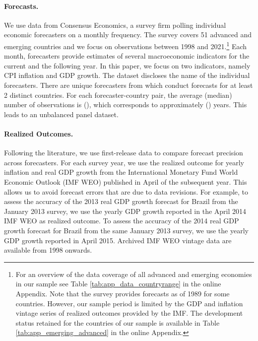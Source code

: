 
\paragraph{Forecasts.} We use data from Consensus Economics, a survey firm polling individual economic forecasters on a monthly frequency. The survey covers 51 advanced and emerging countries and we focus on observations between 1998 and 2021.\footnote{For an overview of the data coverage of all advanced and emerging economies in our sample see Table \ref{tab:app_data_countryrange} in the online Appendix. Note that the survey provides forecasts as of 1989 for some countries. However, our sample period is limited by the GDP and inflation vintage series of realized outcomes provided by the IMF. The development status retained for the countries of our sample is available in Table \ref{tab:app_emerging_advanced} in the online Appendix.} Each month, forecasters provide estimates of several macroeconomic indicators for the current and the following year. %
 In this paper, we focus on two indicators, namely CPI inflation and GDP growth. The dataset discloses the name of the individual forecasters. There are  unique forecasters from which  conduct forecasts for at least 2 distinct countries.  For each forecaster-country pair, the average (median) number of observations is  (), which corresponds to approximately  () years. This leads to an unbalanced panel dataset.


\paragraph{Realized Outcomes.} Following the literature, we use first-release data to compare forecast precision across forecasters. For each survey year, we use the realized outcome for yearly inflation and real GDP growth from the International Monetary Fund World Economic Outlook (IMF WEO) published in April of the subsequent year. This allows us to avoid forecast errors that are due to data revisions. For example, to assess the accuracy of the 2013 real GDP growth forecast for Brazil from the January 2013 survey, we use the yearly GDP growth reported in the April 2014 IMF WEO as realized outcome. To assess the accuracy of the 2014 real GDP growth forecast for Brazil from the same January 2013 survey, we use the yearly GDP growth reported in April 2015. %
 Archived IMF WEO vintage data are available from 1998 onwards.

